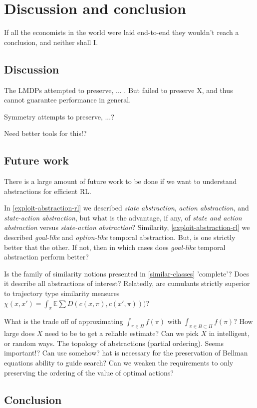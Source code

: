 \chapter{Discussion and conclusion}\label{C:con}

If all the economists in the world were laid end-to-end they wouldn't
reach a conclusion, and neither shall I.


\section{Discussion}

The LMDPs attempted to preserve, ... . But failed to preserve X, and thus cannot guarantee performance in general.

Symmetry attempts to preserve, ...?

Need better tools for this!?


\section{Future work}

There is a large amount of future work to be done if we want to understand abstractions for efficient RL.

In \ref{exploit-abstraction-rl} we described \textit{state abstraction}, \textit{action abstraction}, and \textit{state-action abstraction}, but what is the advantage, if any, of \textit{state and action abstraction} versus \textit{state-action abstraction}? Similarity, \ref{exploit-abstraction-rl} we described \textit{goal-like} and \textit{option-like} temporal abstraction. But, is one strictly better that the other. If not, then in which cases does \textit{goal-like} temporal abstraction perform better?

Is the family of similarity notions presented in \ref{similar-classes} 'complete'? Does it describe all abstractions of interest?
Relatedly, are cumulants strictly superior to trajectory type similarity measures $\chi(x, x') = \int_\pi \mathbb E \sum D(c(x, \pi), c(x', \pi)))$?

What is the trade off of approximating $\int_{\pi \in \Pi}f(\pi)$ with $\int_{\pi \in B \subset \Pi}f(\pi)$?
How large does $X$ need to be to get a reliable estimate? Can we pick $X$ in intelligent, or random ways.
The topology of abstractions (partial ordering). Seems important!? Can use somehow?
hat is necessary for the preservation of Bellman equations ability to guide search? Can we weaken the requirements to only preserving the ordering of the value of optimal actions?



\section{Conclusion}
